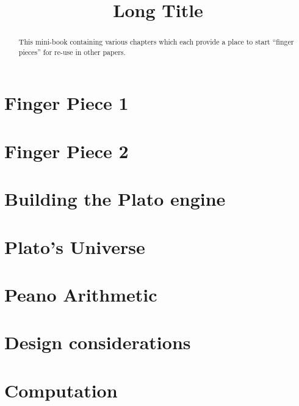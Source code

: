 \documentclass[a4paper,openany]{amsbook}
\begin{document}
\sloppy

\title[Short Title]{Long Title}

%

\begin{abstract}
This mini-book containing various chapters which each provide a place to start
``finger pieces'' for re-use in other papers.
\end{abstract} 
\maketitle 
\tableofcontents 


\chapter{Finger Piece 1}


\chapter{Finger Piece 2}


\chapter{Building the Plato engine}


\chapter{Plato's Universe}


\chapter{Peano Arithmetic}


\chapter{Design considerations}


\chapter{Computation}

\end{document}
